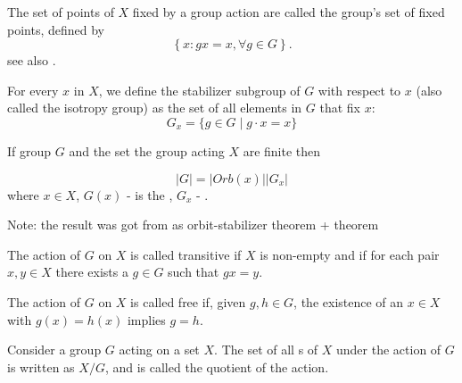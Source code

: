 \begin{appendices}
\begin{definition}
  The set of points of $X$ fixed by a group action are called the
  group's set of fixed points, defined by
  \[
  \left\{
  x: g x = x, \forall g \in G
  \right\}.
  \]
  see also \cite{mathworld:groupfixedpoint}. 
  \label{def:fixedpoint}
\end{definition}

\begin{definition}
  For every $x$ in $X$, we define \cite{wiki:groupaction} the
  stabilizer subgroup of $G$ with 
  respect to $x$ (also called the isotropy group) as the set of all
  elements in $G$ that fix $x$: 
  \[
  G_{x}=\{g\in G\mid g\cdot x=x\}
  \]
  \label{def:stabilizersubgroup}
\end{definition}

\begin{theorem}
  If group $G$ and the set the group acting $X$ are finite then

  \[
  \left|G\right| = \left|Orb\left(x\right)\right|\left|G_x\right|
  \]
  where $x \in X$, $G\left(x\right)$ - is the ,
  $G_x$ - .
  
  Note: the result was got from \cite{wiki:groupaction} as
  orbit-stabilizer theorem +  theorem
  \label{thm:orbitstabilizertheorem}
\end{theorem}

\begin{definition}
  The action of $G$ on $X$ is called \cite{wiki:groupaction}
  transitive if $X$ is non-empty and if for each pair $x, y \in X$ there
  exists a $g \in G$ such that $gx = y$.
  \label{def:transitive}
\end{definition}

\begin{definition}
  The action of $G$ on $X$ is called \cite{wiki:groupaction}
  free if, given $g, h \in G$, the existence of an $x \in X$ with $g(x)
  = h(x)$ implies $g = h$.
  \label{def:freeaction}
\end{definition}

\begin{definition}
  Consider \cite{wiki:groupaction} a group $G$ acting on a set
  $X$. The set of all s of $X$ under the action of
  $G$ is written as $X/G$, and is called the quotient of the action.
  \label{def:quotientofgroupaction}
\end{definition}


\end{appendices}
